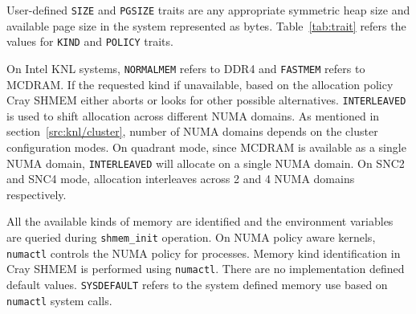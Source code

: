 User-defined \texttt{SIZE} and \texttt{PGSIZE} traits are any appropriate
symmetric heap size
and available page size in the system represented as bytes.
Table~\ref{tab:trait} refers the values for \texttt{KIND} and
\texttt{POLICY} traits. %

On Intel KNL systems, \texttt{NORMALMEM} refers to DDR4 and
\texttt{FASTMEM} refers to
MCDRAM. If the requested kind if unavailable,
based on the allocation policy Cray SHMEM either aborts or looks for
other possible alternatives. \texttt{INTERLEAVED} is used to shift
allocation
across
different NUMA domains. As mentioned in section~\ref{src:knl/cluster},
number of NUMA domains depends on the cluster configuration modes.
On quadrant mode, since MCDRAM is
available as a
single NUMA domain, \texttt{INTERLEAVED} will allocate on a single
NUMA domain.
On SNC2 and SNC4 mode, allocation interleaves across 2 and 4 NUMA
domains
respectively.

All the available kinds of memory are identified and the environment
variables are queried during \texttt{shmem\_init} operation. On NUMA
policy aware kernels,
\texttt{numactl} controls the NUMA policy for processes.%
Memory kind identification in Cray SHMEM
is performed using \texttt{numactl}. There are no implementation defined
default values. \texttt{SYSDEFAULT} refers to the system defined memory
use based
on \texttt{numactl} system calls.